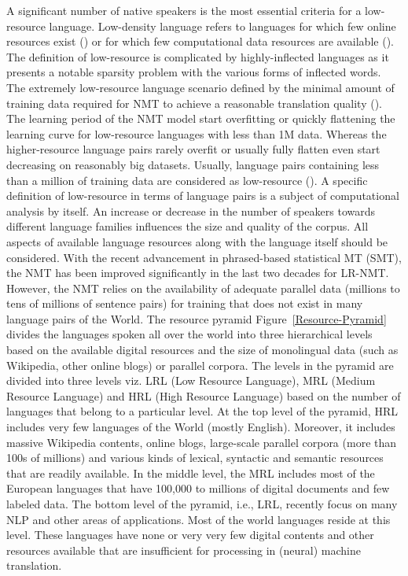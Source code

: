 \documentclass[manuscript,screen]{acmart}
\begin{document}
A significant number of native speakers is the most essential criteria for a low-resource language. Low-density language refers to languages for which few online resources exist (\citet{megerdoomian2008low,probst2001design}) or for which few computational data resources are available (\citet{hogan1999ocr}). The definition of low-resource is complicated by highly-inflected languages as it presents a notable sparsity problem with the various forms of inflected words.  The extremely low-resource language scenario defined by the minimal amount of training data required for NMT to achieve a reasonable translation quality (\citet{gu2018universal}). The learning period of the NMT model start overfitting or quickly flattening the learning curve for low-resource languages with less than 1M data. Whereas the higher-resource language pairs rarely overfit or usually fully flatten even start decreasing on reasonably big datasets. Usually, language pairs containing less than a million of training data are considered as low-resource (\citet{kocmi2020exploring}).
A specific definition of low-resource in terms of language pairs is a subject of computational analysis by itself. An increase or decrease in the number of speakers towards different language families influences the size and quality of the corpus. All aspects of available language resources along with the language itself should be considered. With the recent advancement in phrased-based statistical MT (SMT), the NMT has been improved significantly in the last two decades for LR-NMT. However, the NMT relies on the availability of adequate parallel data (millions to tens of millions of sentence pairs) for training that does not exist in many language pairs of the World. The resource pyramid Figure~\ref{Resource-Pyramid} divides the languages spoken all over the world into three hierarchical levels based on the available digital resources and the size of monolingual data (such as Wikipedia, other online blogs) or parallel corpora. The levels in the pyramid are divided into three levels viz. LRL (Low Resource Language), MRL (Medium Resource Language) and HRL (High Resource Language) based on the number of languages that belong to a particular level. At the top level of the pyramid, HRL includes very few languages of the World (mostly English). Moreover, it includes massive Wikipedia contents, online blogs, large-scale parallel corpora (more than 100s of millions) and various kinds of lexical, syntactic and semantic resources that are readily available. 
In the middle level, the MRL includes most of the European languages that have 100,000 to millions of digital documents and few labeled data.
The bottom level of the pyramid, i.e., LRL, recently focus on many NLP and other areas of applications. Most of the world languages reside at this level. These languages have none or very very few digital contents and other resources available that are insufficient for processing in (neural) machine translation.
\end{document}
